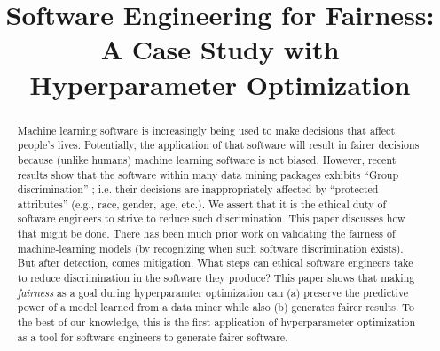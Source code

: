 \documentclass[10pt,conference]{IEEEtran}
\begin{document}
\title{Software Engineering for Fairness: A Case Study with Hyperparameter Optimization}

\author{}



\maketitle
\thispagestyle{plain}
\pagestyle{plain}

\begin{abstract}
Machine learning software is increasingly being used to make decisions that affect people's lives.  Potentially,  the application of that software will result in fairer decisions because (unlike humans) machine learning software is not biased. However, recent results show that the software within many data mining packages exhibits ``Group discrimination'' ; i.e. their decisions are  inappropriately affected by   “protected attributes” (e.g., race, gender, age, etc.). We assert that it is the ethical duty of software engineers to strive to reduce such discrimination.  This paper discusses how that might be done.  There has been much prior work  on validating the fairness of machine-learning models (by recognizing when such software discrimination exists). But after detection, comes mitigation. What steps can ethical software engineers take to reduce discrimination in the software they produce?  This paper shows that making \textit{fairness} as a goal during hyperparamter optimization can (a) preserve the predictive power of a model learned from a data miner while also (b) generates fairer results. To the best of  our knowledge, this is the first application  of hyperparameter optimization as a tool for software engineers to generate fairer software.
\end{abstract}
\end{document}

